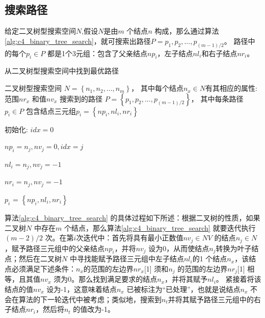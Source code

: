         \subsection{搜索路径}

        给定二叉树型搜索空间$N$,假设$N$是由$m$ 个结点$n$ 构成，那么通过算法\ref{alg:c4_binary_tree_search}，就可搜索出路径$P={p_1,p_2,...,p_{(m-1)/2}}$。 路径中的每个$p_i \in P$ 都是1个3元组：包含了父亲结点$np_i$，左子结点$nl_i$和右子结点$nr_i$。

        \begin{algorithm}[!h]
    	\renewcommand{\algorithmicrequire}{\textbf{输入:}}	
        \renewcommand{\algorithmicensure}{\textbf{输出:}}
    	\caption{从二叉树型搜索空间中找到最优路径}
    	\label{alg:c4_binary_tree_search}
    	\begin{algorithmic}[1]
    		\REQUIRE 二叉树型搜索空间 $N=\left\{n_1,n_2,...,n_m\right\}$， 其中每个结点$n_x \in N$有其相应的属性: 范围$nr_x$ 和值$nv_x$
    		\ENSURE 搜索到的路径 $P=\left\{p_1,p_2,...,p_{(m-1)/2}\right\}$， 其中每条路径$p_{i} \in P$ 包含结点三元组$p_{i}=\left\{np_{i},nl_{i},nr_{i}\right\}$

          \STATE 初始化: $idx=0$

          \STATE $np_i = n_j, nv_j = 0, idx = j$
          \ENDIF

          \STATE $nl_i = n_j, nv_j = -1$
          \ENDIF

          \STATE $nr_i = n_j, nv_j = -1$
          \ENDIF

          \ENDFOR

          \STATE $p_{i}$ = $\left\{ np_{i},nl_{i},nr_{i} \right\}$

          \ENDFOR
    	  \end{algorithmic}
        \end{algorithm}

        算法\ref{alg:c4_binary_tree_search} 的具体过程如下所述：根据二叉树的性质，如果二叉树$N$ 中存在$m$ 个结点，那么算法\ref{alg:c4_binary_tree_search} 就要迭代执行$(m-2)/2$ 次。在第$i$次迭代中：首先将具有最小正数值$nv_j \in NV$ 的结点$n_j \in N$，赋予路径三元组中的父亲结点$np_i$，并将$nv_j$ 设为0，从而使结点$n_j$转换为叶子结点；然后在二叉树$N$ 中寻找能赋予路径三元组中左子结点$nl_i$的1 个结点$n_x$，该结点必须满足下述条件：$n_x$的范围的左边界$nr_x$[1] 须和$n_j$ 的范围的左边界$nr_j$[1] 相等，且其值$nv_x$ 须为0。那么找到满足要求的结点$n_x$，并将其赋予$nl_i$。 紧接着将该结点的值$nv_x$ 设为-1，这意味着结点$n_x$ 已被标注为``已处理''，也就是说结点$n_x$ 不会在算法的下一轮迭代中被考虑；类似地，搜索到$n_t$并将其赋予路径三元组中的右子结点$nr_i$，然后将$n_t$ 的值改为-1。


